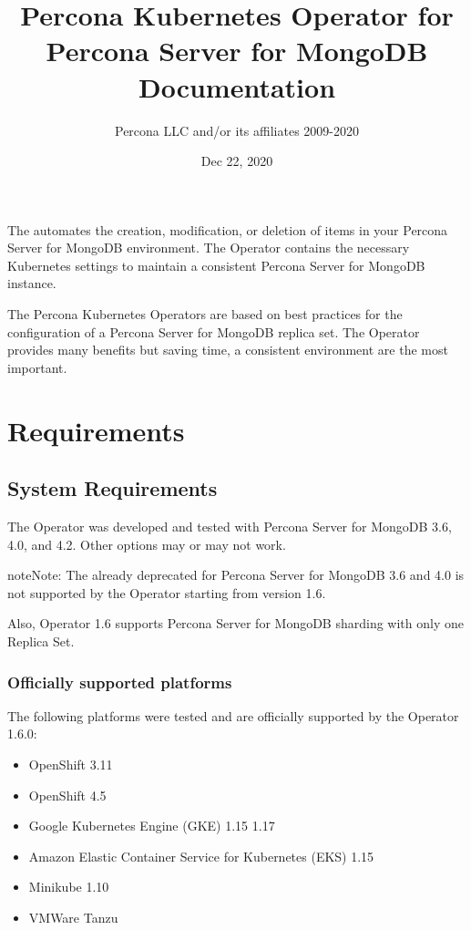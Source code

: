 \documentclass[letterpaper,10pt,english]{sphinxmanual}
\title{Percona Kubernetes Operator for Percona Server for MongoDB Documentation}
\date{Dec 22, 2020}
\author{Percona LLC and/or its affiliates 2009-2020}
\begin{document}
\pagestyle{empty}
\sphinxmaketitle
\pagestyle{plain}
\sphinxtableofcontents
\pagestyle{normal}
\label{\detokenize{index::doc}}


The  automates the creation, modification, or deletion of items in your Percona Server for MongoDB environment. The Operator contains the necessary Kubernetes settings to maintain a consistent Percona Server for MongoDB instance.

The Percona Kubernetes Operators are based on best practices for the configuration of a Percona Server for MongoDB replica set. The Operator provides many benefits but saving time, a consistent environment are the most important.


\part{Requirements}
\label{\detokenize{index:requirements}}

\chapter{System Requirements}
\label{\detokenize{System-Requirements:system-requirements}}\label{\detokenize{System-Requirements::doc}}
The Operator was developed and tested with Percona Server for MongoDB 3.6, 4.0,
and 4.2. Other options may or may not work.

\begin{sphinxadmonition}{note}{Note:}
The already deprecated 
for Percona Server for MongoDB 3.6 and 4.0 is not supported by the Operator
starting from version 1.6.
\end{sphinxadmonition}

Also, Operator 1.6 supports Percona Server for MongoDB sharding with only one
Replica Set.


\section{Officially supported platforms}
\label{\detokenize{System-Requirements:officially-supported-platforms}}
The following platforms were tested and are officially supported by the Operator
1.6.0:
\begin{itemize}
\item {} 
OpenShift 3.11

\item {} 
OpenShift 4.5

\item {} 
Google Kubernetes Engine (GKE) 1.15 \sphinxhyphen{} 1.17

\item {} 
Amazon Elastic Container Service for Kubernetes (EKS) 1.15

\item {} 
Minikube 1.10

\item {} 
VMWare Tanzu

\end{itemize}
\end{document}
